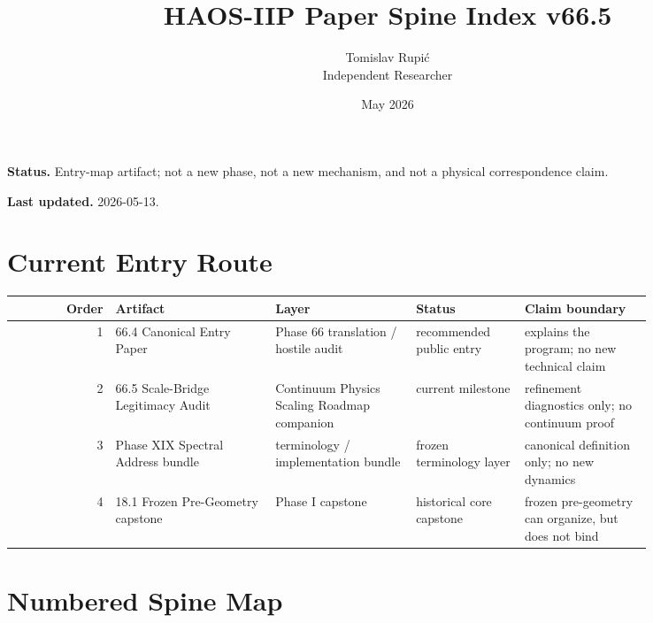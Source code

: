 \documentclass[10pt]{article}
\title{HAOS-IIP Paper Spine Index v66.5}
\author{Tomislav Rupi\'c \\ Independent Researcher}
\date{May 2026}
\begin{document}
\maketitle

\noindent\textbf{Status.} Entry-map artifact; not a new phase, not a new mechanism, and not a physical correspondence claim.

\noindent\textbf{Last updated.} 2026-05-13.

\section*{Current Entry Route}

\begin{center}
\scriptsize
\begin{tabular}{r p{0.25\linewidth}p{0.22\linewidth}p{0.17\linewidth}p{0.20\linewidth}}
\toprule
Order & Artifact & Layer & Status & Claim boundary \\
\midrule
1 & 66.4 Canonical Entry Paper & Phase 66 translation / hostile audit & recommended public entry & explains the program; no new technical claim \\
2 & 66.5 Scale-Bridge Legitimacy Audit & Continuum Physics Scaling Roadmap companion & current milestone & refinement diagnostics only; no continuum proof \\
3 & Phase XIX Spectral Address bundle & terminology / implementation bundle & frozen terminology layer & canonical definition only; no new dynamics \\
4 & 18.1 Frozen Pre-Geometry capstone & Phase I capstone & historical core capstone & frozen pre-geometry can organize, but does not bind \\
\bottomrule
\end{tabular}
\end{center}

\section*{Numbered Spine Map}
\end{document}
